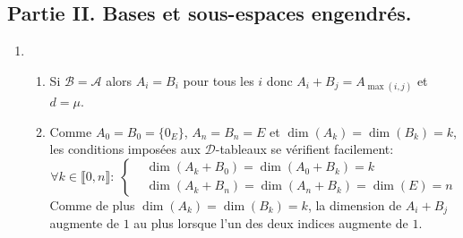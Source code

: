 \subsection*{Partie II. Bases et sous-espaces engendrés.}
\begin{enumerate}
  \item 
\begin{enumerate}
  \item Si $\mathcal{B} = \mathcal{A}$ alors $A_i=B_i$ pour tous les $i$ donc $A_i + B_j = A_{\max(i,j)}$ et $d = \mu$.
  \item Comme $A_0=B_0=\{0_E\}$,  $A_n=B_n=E$ et $\dim(A_k)=\dim(B_k)=k$, les conditions imposées aux $\mathcal{D}$-tableaux se vérifient facilement:
\begin{displaymath}
  \forall k \in \llbracket 0,n \rrbracket:\;
  \left\lbrace 
  \begin{aligned}
    &\dim(A_k + B_0) =  \dim(A_0 + B_k) = k\\
    &\dim(A_k + B_n)  = \dim(A_n + B_k) = \dim(E) = n
  \end{aligned}
  \right. 
\end{displaymath}
Comme de plus $\dim(A_{k})=\dim(B_k)=k$, la dimension de $A_i + B_j$ augmente de $1$ au plus lorsque l'un des deux indices augmente de $1$.


\end{enumerate}
\end{enumerate}
